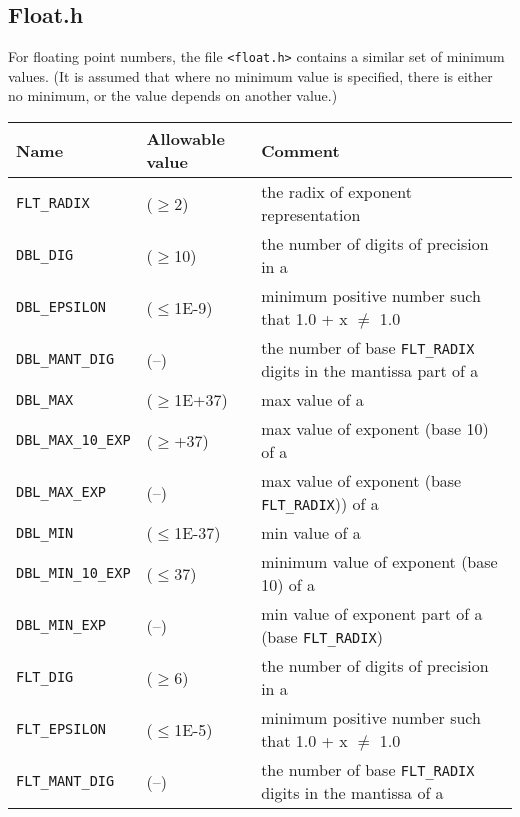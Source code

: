   

  \subsection{Float.h}
   

   For floating point numbers, the file \texttt{<float.h>}
    contains a similar set of minimum values.  (It is assumed that where no
    minimum value is specified, there is either no minimum, or
    the value depends on another value.)


    \begin{longtable}{lp{}p{}}
      \toprule
     Name & Allowable value & Comment    \\
    \midrule
     \texttt{FLT\_RADIX}   & ($\geq$2)  & the radix of exponent representation \\
     \texttt{DBL\_DIG}     & ($\geq$10) & the number of digits of precision
                                        in a \double{} \\
     \texttt{DBL\_EPSILON} & ($\leq$1E-9) & minimum positive number such that 1.0 + x $\neq$ 1.0    \\
     \texttt{DBL\_MANT\_DIG} & (--) & the number of base \texttt{FLT\_RADIX} digits in the mantissa part of a \double{}   \\
     \texttt{DBL\_MAX} & ($\geq$1E+37) & max value of a \double{}   \\
     \texttt{DBL\_MAX\_10\_EXP} & ($\geq$+37) & max value of exponent (base 10) of a \double{}    \\
     \texttt{DBL\_MAX\_EXP} & (--) & max value of exponent (base \texttt{FLT\_RADIX})) of a \double{}    \\
     \texttt{DBL\_MIN} & ($\leq$1E-37) & min value of a \double{}   \\
     \texttt{DBL\_MIN\_10\_EXP} & ($\leq$37) & minimum value of exponent (base 10) of a \double{}   \\
     \texttt{DBL\_MIN\_EXP} & (--) & min value of exponent part of a \double{} (base  \texttt{FLT\_RADIX})    \\
     \texttt{FLT\_DIG} & ($\geq$6) & the number of digits of precision in a \float{}  \\
     \texttt{FLT\_EPSILON} & ($\leq$1E-5) & minimum positive number such that 1.0 + x $\neq$ 1.0 \\
     \texttt{FLT\_MANT\_DIG} & (--) & the number of base \texttt{FLT\_RADIX} digits in the mantissa of a \float{} \\

\end{longtable}
